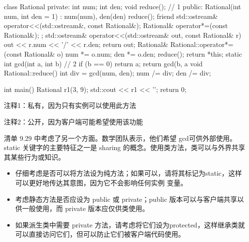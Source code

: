 
\begin{cpp}
class Rational {
private:
  int num;
  int den;
  void reduce(); // 1
public:
  Rational(int num, int den = 1) : num(num), den(den) { reduce(); }
  friend std::ostream& operator<<(std::ostream&, const Rational&);
  Rational& operator*=(const Rational&);
};
std::ostream& operator<<(std::ostream& out, const Rational& r) {
  out << r.num << '/' << r.den;
  return out;
}
Rational& Rational::operator*=(const Rational& o) {
  num *= o.num;
  den *= o.den;
  reduce();
  return *this;
}
static int gcd(int a, int b) { // 2
  if (b == 0)
    return a;
  return gcd(b, a %
}
void Rational::reduce() {
  int div = gcd(num, den);
  num /= div;
  den /= div;
}

int main() {
  Rational r1(3, 9);
  std::cout << r1 << '\n';
  return 0;
}
\end{cpp}

{\footnotesize
注释1：私有，因为只有实例可以使用此方法

注释2：公开，因为客户端可能希望使用该功能
}

清单 9.29 中考虑了另一个方面。数学团队表示，他们希望 gcd可供外部使用。static 关键字的主要特征之一是 sharing 的概念。使用类方法，类可以与外界共享其某些行为或知识。


\begin{itemize}
\item
仔细考虑是否可以将方法设为纯方法；如果可以，请将其标记为static，这样可以更好地传达其意图，因为它不会影响任何实例 变量。

\item
考虑静态方法是否应设为 public 或 private；public 版本可以与客户端共享以供一般使用，而 private 版本应仅供类使用。

\item
如果派生类中需要 private 方法，请考虑将它们设为protected，这样继承类就可以直接访问它们，但可以防止它们被客户端代码使用。
\end{itemize}








